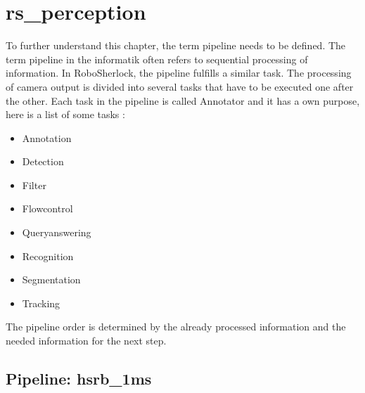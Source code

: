 \documentclass[main.tex]{subfiles}
\begin{document}
		\section{rs\_perception}
To further understand this chapter, the term pipeline needs to be defined. The term pipeline in the informatik often refers to sequential processing of information.
In RoboSherlock, the pipeline fulfills a similar task. The processing of camera output is divided into several tasks that have to be executed one after the other.
Each task in the pipeline is called Annotator and it has a own purpose, here is a list of some tasks : 
		\begin{itemize}
			\item Annotation
			\item Detection
			\item Filter
			\item Flowcontrol
			\item Queryanswering
			\item Recognition 
			\item Segmentation
			\item Tracking
		\end{itemize}		
The pipeline order is determined by the already processed information and the needed information for the next step.

			\subsection{Pipeline: hsrb\_1ms}
\end{document}
